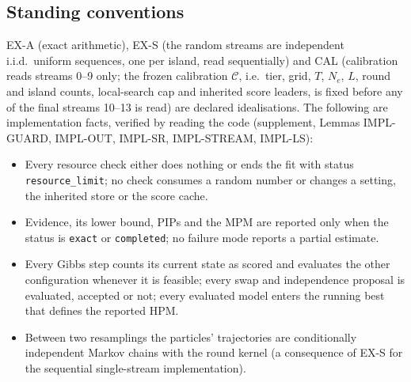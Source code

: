 \providecommand{\Zh}{\widehat Z}
\providecommand{\PIPh}{\widehat{\mathrm{PIP}}}
\providecommand{\cC}{\mathcal C}
\providecommand{\cA}{\mathcal A}
\providecommand{\cS}{\mathcal S}
\providecommand{\cO}{\mathcal O}
\providecommand{\cG}{\mathcal G}
\providecommand{\Rbar}{\bar R}

\subsection*{Standing conventions}

\begin{definition}\label{def:standing}
EX-A (exact arithmetic), EX-S (the random streams are independent i.i.d.\ uniform sequences, one per island, read
sequentially) and CAL (calibration reads streams 0--9 only; the frozen calibration $\cC$, i.e.\ tier, grid, $T$, $N_e$,
$L$, round and island counts, local-search cap and inherited score leaders, is fixed before any of the final streams
10--13 is read) are declared idealisations. The following are implementation facts, verified by reading the code
(supplement, Lemmas IMPL-GUARD, IMPL-OUT, IMPL-SR, IMPL-STREAM, IMPL-LS):
\begin{itemize}
\item[GUARD] Every resource check either does nothing or ends the fit with status \texttt{resource\_limit}; no check
  consumes a random number or changes a setting, the inherited store or the score cache.
\item[OUT] Evidence, its lower bound, PIPs and the MPM are reported only when the status is \texttt{exact} or
  \texttt{completed}; no failure mode reports a partial estimate.
\item[SR] Every Gibbs step counts its current state as scored and evaluates the other configuration whenever it is
  feasible; every swap and independence proposal is evaluated, accepted or not; every evaluated model enters the
  running best that defines the reported HPM.
\item[STREAM] Between two resamplings the particles' trajectories are conditionally independent Markov chains with
  the round kernel (a consequence of EX-S for the sequential single-stream implementation).
\end{itemize}
\end{definition}

